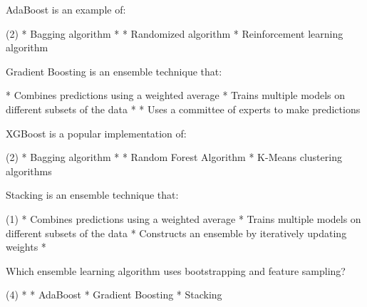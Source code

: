 \documentclass[11pt]{extarticle}
\begin{document}
\begin{exercise}
    AdaBoost is an example of:
    \begin{choice} (2)
        * Bagging algorithm
        * 
        * Randomized algorithm
        * Reinforcement learning algorithm
    \end{choice}
\end{exercise}
\begin{solution}
\end{solution}

\begin{exercise}
    Gradient Boosting is an ensemble technique that:
    \begin{choice}
        * Combines predictions using a weighted average
        * Trains multiple models on different subsets of the data
        * 
        * Uses a committee of experts to make predictions
    \end{choice}
\end{exercise}
\begin{solution}
\end{solution}

\begin{exercise}
    XGBoost is a popular implementation of:
    \begin{choice}(2)
        * Bagging algorithm
        * 
        * Random Forest Algorithm
        * K-Means clustering algorithms
    \end{choice}
\end{exercise}
\begin{solution}
\end{solution}

\begin{exercise}
    Stacking is an ensemble technique that:
    \begin{choice} (1)
        * Combines predictions using a weighted average
        * Trains multiple models on different subsets of the data
        * Constructs an ensemble by iteratively updating weights
        * 
    \end{choice}
\end{exercise}
\begin{solution}
\end{solution}

\begin{exercise}
    Which ensemble learning algorithm uses bootstrapping and feature sampling?
    \begin{choice} (4)
        * 
        * AdaBoost
        * Gradient Boosting
        * Stacking
    \end{choice}
\end{exercise}
\begin{solution}
\end{solution}
\end{document}
